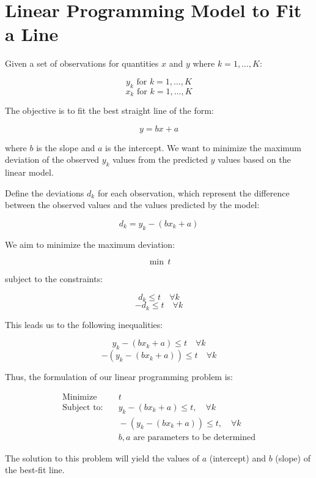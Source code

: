 \documentclass{article}
\begin{document}
\section*{Linear Programming Model to Fit a Line}

Given a set of observations for quantities \( x \) and \( y \) where \( k = 1, \ldots, K \):

\[
y_k \text{ for } k = 1, \ldots, K
\]
\[
x_k \text{ for } k = 1, \ldots, K
\]

The objective is to fit the best straight line of the form:

\[
y = bx + a
\]

where \( b \) is the slope and \( a \) is the intercept. We want to minimize the maximum deviation of the observed \( y_k \) values from the predicted \( y \) values based on the linear model.

Define the deviations \( d_k \) for each observation, which represent the difference between the observed values and the values predicted by the model:

\[
d_k = y_k - (bx_k + a)
\]

We aim to minimize the maximum deviation:

\[
\min \, t
\]

subject to the constraints:

\[
d_k \leq t \quad \forall k
\]
\[
-d_k \leq t \quad \forall k
\]

This leads us to the following inequalities:

\[
y_k - (bx_k + a) \leq t \quad \forall k
\]
\[
-(y_k - (bx_k + a)) \leq t \quad \forall k
\]

Thus, the formulation of our linear programming problem is:

\[
\begin{align*}
\text{Minimize} & \quad t \\
\text{Subject to:} & \quad y_k - (bx_k + a) \leq t, \quad \forall k \\
& \quad -(y_k - (bx_k + a)) \leq t, \quad \forall k \\
& \quad b, a \text{ are parameters to be determined}
\end{align*}
\]

The solution to this problem will yield the values of \( a \) (intercept) and \( b \) (slope) of the best-fit line.
\end{document}
